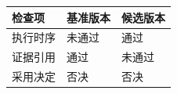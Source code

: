 \begin{tabular}{@{}P{3.7cm}P{4.3cm}P{4.3cm}@{}}
\toprule
\textbf{检查项} & \textbf{基准版本} & \textbf{候选版本} \\
\midrule
执行时序 & 未通过 & 通过 \\
证据引用 & 通过 & 未通过 \\
采用决定 & 否决 & 否决 \\
\bottomrule
\end{tabular}
